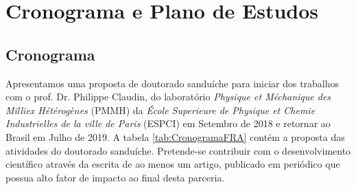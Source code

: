 \chapter{Cronograma e Plano de Estudos}
\section{Cronograma}
\label{ch:Chronogram}

    Apresentamos uma proposta de doutorado sanduíche para iniciar dos trabalhos com o prof. Dr. Philippe Claudin, do laboratório \textit{Physique et Méchanique des Milliex Hétérogènes} (PMMH) da \textit{École Superieure de Physique et Chemie Industrielles de la ville de Paris} (ESPCI) em Setembro de 2018 e retornar ao Brasil em Julho de 2019. A tabela \ref{tab:CronogramaFRA} contém a proposta das atividades do doutorado sanduíche. Pretende-se contribuir com o desenvolvimento científico através da escrita de ao menos um artigo, publicado em periódico que possua alto fator de impacto ao final desta parceria.

\setlength{\tabcolsep}{3pt}

